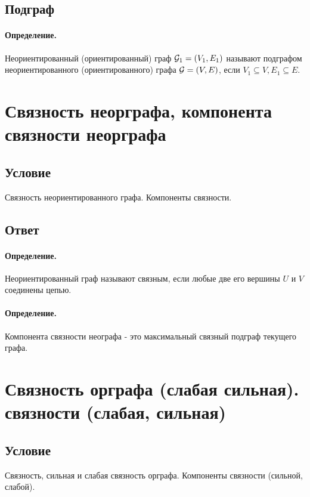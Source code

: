 \documentclass{report}
\begin{document}
\subsection{Подграф}
\paragraph*{Определение.}
Неориентированный (ориентированный) граф $ {\cal G}_1 = (V_1, E_1)$ называют подграфом
неориентированного (ориентированного) графа $ {\cal G} = (V, E)$, если
$V_1 \subseteq V, E_1 \subseteq E$.

\newpage

\section{Связность неорграфа, компонента связности неорграфа}
\subsection{Условие}
Связность неориентированного графа. Компоненты
связности.

\subsection{Ответ}

\paragraph*{Определение.}
Неориентированный граф называют связным, если любые две его вершины $U$ и  $V$ соединены цепью.

\paragraph*{Определение.}
Компонента связности неографа - это максимальный связный подграф текущего графа.

\newpage

\section{Связность орграфа (слабая сильная).
   связности (слабая, сильная)}
\subsection{Условие}
Связность, сильная и слабая связность орграфа. Компоненты
связности (сильной, слабой).
\end{document}
